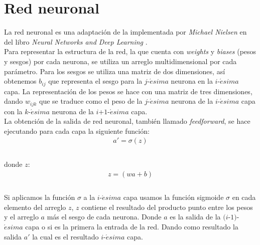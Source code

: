 \documentclass{iccmemoria}
\begin{document}
\section{Red neuronal}

La red neuronal es una adaptación de la implementada por \emph{Michael Nielsen} en del libro \emph{Neural Networks and Deep Learning} \cite{NeuralNetworksAndDeepLearning}.\\
 
Para representar la estructura de la red, la que cuenta con \emph{weights} y \emph{biases} (pesos y sesgos) por cada neurona, se utiliza un arreglo multidimensional por cada parámetro. Para los sesgos se utiliza una matriz de dos dimensiones, así obtenemos $b_{ij}$ que representa el sesgo para la $j$-$\acute{e}sima$ neurona en la $i$-$\acute{e}sima$ capa. La representación de los pesos se hace con una matriz de tres dimensiones, dando $w_{ijk}$ que se traduce como el peso de la $j$-$\acute{e}sima$ neurona de la $i$-$\acute{e}sima$ capa con la $k$-$\acute{e}sima$ neurona de la $i$+$1$-$\acute{e}sima$ capa.\\
 
La obtención de la salida de red neuronal, también llamado \emph{feedforward}, se hace ejecutando para cada capa la siguiente función:\\

\begin{equation}
	\begin{split}
	a' = \sigma{(z)}\\
	\end{split}
\end{equation}\\

donde $z$:\\

\begin{equation}
	\begin{split}
	z = (wa + b)\\
	\end{split}
\end{equation}\\

Si aplicamos la función $\sigma$ a la $i$-$\acute{e}sima$ capa usamos la función sigmoide $\sigma$ en cada elemento del arreglo $z$, $z$ contiene el resultado del producto punto entre los pesos y el arreglo $a$ más el sesgo de cada neurona. Donde $a$ es la salida de la $(i$-$1)$-$\acute{e}sima$ capa o si es la primera la entrada de la red. Dando como resultado la salida $a'$ la cual es el resultado $i$-$\acute{e}sima$ capa.\\
\end{document}
